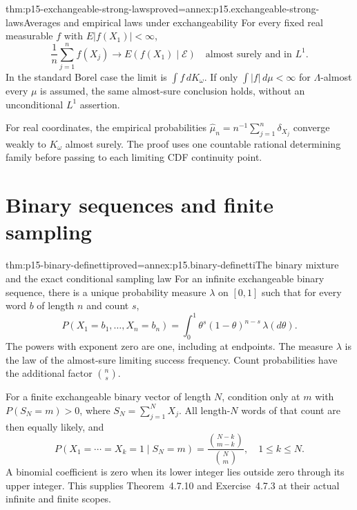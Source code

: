 \begin{hbtheorem}{thm:p15-exchangeable-strong-laws}{proved=annex:p15.exchangeable-strong-laws}{Averages and empirical laws under exchangeability}
For every fixed real measurable \(f\) with \(E|f(X_1)|<\infty\),
\[
       \frac1n\sum_{j=1}^nf(X_j)\longrightarrow
                   E(f(X_1)\mid\mathcal E)
                          \quad\text{almost surely and in }L^1.
\]
In the standard Borel case the limit is \(\int f\,dK_\omega\).
If only \(\int|f|\,d\mu<\infty\) for \(\Lambda\)-almost every
\(\mu\) is assumed, the same almost-sure conclusion holds, without
an unconditional \(L^1\) assertion.

For real coordinates, the empirical probabilities
\(\widehat\mu_n=n^{-1}\sum_{j=1}^n\delta_{X_j}\)
converge weakly to \(K_\omega\) almost surely.
The proof uses one countable rational determining family before
passing to each limiting CDF continuity point.
\end{hbtheorem}

\section{Binary sequences and finite sampling}

\begin{hbtheorem}{thm:p15-binary-definetti}{proved=annex:p15.binary-definetti}{The binary mixture and the exact conditional sampling law}
For an infinite exchangeable binary sequence, there is a unique
probability measure \(\lambda\) on \([0,1]\) such that for every
word \(b\) of length \(n\) and count \(s\),
\[
             P(X_1=b_1,\ldots,X_n=b_n)
                    =\int_0^1\theta^s(1-\theta)^{n-s}\,\lambda(d\theta).
\]
The powers with exponent zero are one, including at endpoints.
The measure \(\lambda\) is the law of the almost-sure limiting
success frequency. Count probabilities have the additional factor
\(\binom ns\).

For a finite exchangeable binary vector of length \(N\), condition
only at \(m\) with \(P(S_N=m)>0\), where \(S_N=\sum_{j=1}^NX_j\).
All length-\(N\) words of that count are then equally likely, and
\[
              P(X_1=\cdots=X_k=1\mid S_N=m)
                  =\frac{\binom{N-k}{m-k}}{\binom Nm},
                           \quad 1\leq k\leq N.
\]
A binomial coefficient is zero when its lower integer lies outside
zero through its upper integer. This supplies Theorem~4.7.10 and
Exercise~4.7.3 at their actual infinite and finite scopes.
\end{hbtheorem}

